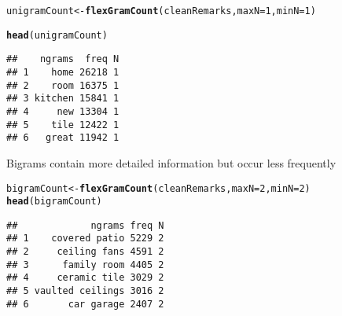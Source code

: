 \documentclass{article}\usepackage[]{graphicx}\usepackage[]{color}
\makeatletter
\newcommand{\hlnum}[1]{\textcolor[rgb]{0.686,0.059,0.569}{#1}}%
\newcommand{\hlstd}[1]{\textcolor[rgb]{0.345,0.345,0.345}{#1}}%
\newcommand{\hlkwb}[1]{\textcolor[rgb]{0.69,0.353,0.396}{#1}}%
\newcommand{\hlkwc}[1]{\textcolor[rgb]{0.333,0.667,0.333}{#1}}%
\newcommand{\hlkwd}[1]{\textcolor[rgb]{0.737,0.353,0.396}{\textbf{#1}}}%
\newenvironment{kframe}{%
 \def\at@end@of@kframe{}%
 \ifinner\ifhmode%
  \def\at@end@of@kframe{\end{minipage}}%
  \begin{minipage}{\columnwidth}%
 \fi\fi%
 \def\FrameCommand##1{\hskip\@totalleftmargin \hskip-\fboxsep
 \colorbox{shadecolor}{##1}\hskip-\fboxsep
     \hskip-\linewidth \hskip-\@totalleftmargin \hskip\columnwidth}%
 \MakeFramed {\advance\hsize-\width
   \@totalleftmargin\z@ \linewidth\hsize
   \@setminipage}}%
 {\par\unskip\endMakeFramed%
 \at@end@of@kframe}
\newenvironment{knitrout}{}{} %
\makeatother
\begin{document}
\begin{knitrout}\footnotesize
{}\color{fgcolor}\begin{kframe}
\begin{alltt}
\hlstd{unigramCount} \hlkwb{<-} \hlkwd{flexGramCount}\hlstd{(cleanRemarks ,} \hlkwc{maxN}\hlstd{=}\hlnum{1} \hlstd{,} \hlkwc{minN}\hlstd{=}\hlnum{1}\hlstd{)}
\end{alltt}


{\ttfamily\noindent\itshape\color{messagecolor}{\#\# Loading required package: ngram}}

{\ttfamily\noindent\itshape\color{messagecolor}{\#\# Loading required package: doParallel}}

{\ttfamily\noindent\itshape\color{messagecolor}{\#\# Loading required package: foreach}}

{\ttfamily\noindent\itshape\color{messagecolor}{\#\# Loading required package: iterators}}

{\ttfamily\noindent\itshape\color{messagecolor}{\#\# Loading required package: parallel}}

{\ttfamily\noindent\itshape\color{messagecolor}{\#\# Loading required package: stringi}}\begin{alltt}
\hlkwd{head}\hlstd{(unigramCount)}
\end{alltt}
\begin{verbatim}
##    ngrams  freq N
## 1    home 26218 1
## 2    room 16375 1
## 3 kitchen 15841 1
## 4     new 13304 1
## 5    tile 12422 1
## 6   great 11942 1
\end{verbatim}
\end{kframe}
\end{knitrout}

\noindent Bigrams contain more detailed information but occur less frequently
\begin{knitrout}\footnotesize
{}\color{fgcolor}\begin{kframe}
\begin{alltt}
\hlstd{bigramCount} \hlkwb{<-} \hlkwd{flexGramCount}\hlstd{(cleanRemarks ,} \hlkwc{maxN}\hlstd{=}\hlnum{2} \hlstd{,} \hlkwc{minN}\hlstd{=}\hlnum{2}\hlstd{)}
\hlkwd{head}\hlstd{(bigramCount)}
\end{alltt}
\begin{verbatim}
##             ngrams freq N
## 1    covered patio 5229 2
## 2     ceiling fans 4591 2
## 3      family room 4405 2
## 4     ceramic tile 3029 2
## 5 vaulted ceilings 3016 2
## 6       car garage 2407 2
\end{verbatim}
\end{kframe}
\end{knitrout}
\end{document}
